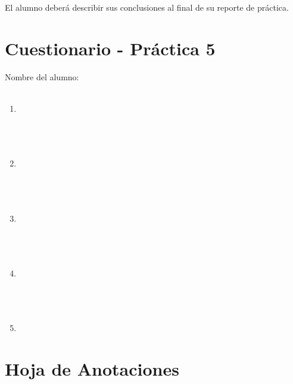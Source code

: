 	El alumno deberá describir sus conclusiones al final de su reporte de práctica.


\clearpage
\section{Cuestionario - Práctica 5}
	Nombre del alumno: \\[0.2cm]
	\horrule{0.5pt} \\[0.2cm] %

	\begin{enumerate}
		\item \\ \\ \\ \\
		\item \\ \\ \\ \\
		\item \\ \\ \\ \\
		\item \\ \\ \\ \\
		\item \\
	\end{enumerate}


\clearpage
\section{Hoja de Anotaciones}

